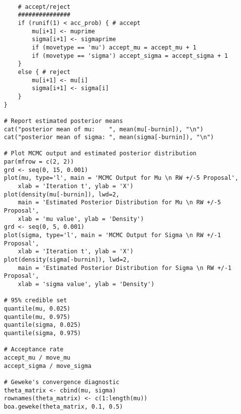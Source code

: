\documentclass[12pt,openany]{article}
\theoremstyle{remark} %
\theoremstyle{definition} %
\begin{document}
\begin{verbatim}
	
    # accept/reject
    ###############
    if (runif(1) < acc_prob) { # accept
        mu[i+1] <- muprime
        sigma[i+1] <- sigmaprime
        if (movetype == 'mu') accept_mu = accept_mu + 1
        if (movetype == 'sigma') accept_sigma = accept_sigma + 1
    }
    else { # reject
        mu[i+1] <- mu[i]
        sigma[i+1] <- sigma[i]
    }
}

# Report estimated posterior means
cat("posterior mean of mu:    ", mean(mu[-burnin]), "\n")
cat("posterior mean of sigma: ", mean(sigma[-burnin]), "\n")

# Plot MCMC output and estimated posterior distribution
par(mfrow = c(2, 2))
grd <- seq(0, 15, 0.001)
plot(mu, type='l', main = 'MCMC Output for Mu \n RW +/-5 Proposal', 
    xlab = 'Iteration t', ylab = 'X')
plot(density(mu[-burnin]), lwd=2, 
    main = 'Estimated Posterior Distribution for Mu \n RW +/-5 Proposal', 
    xlab = 'mu value', ylab = 'Density')
grd <- seq(0, 5, 0.001)
plot(sigma, type='l', main = 'MCMC Output for Sigma \n RW +/-1 Proposal', 
    xlab = 'Iteration t', ylab = 'X')
plot(density(sigma[-burnin]), lwd=2, 
    main = 'Estimated Posterior Distribution for Sigma \n RW +/-1 Proposal', 
    xlab = 'sigma value', ylab = 'Density')
    
# 95% credible set
quantile(mu, 0.025)
quantile(mu, 0.975)
quantile(sigma, 0.025)
quantile(sigma, 0.975)

# Acceptance rate
accept_mu / move_mu
accept_sigma / move_sigma

# Geweke's convergence diagnostic
theta_matrix <- cbind(mu, sigma)
rownames(theta_matrix) <- c(1:length(mu))
boa.geweke(theta_matrix, 0.1, 0.5)

\end{verbatim}
\end{document}
